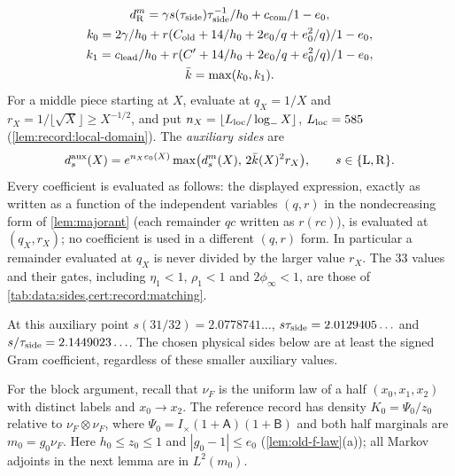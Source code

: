 \begin{definition}
\begin{gather*}
 d^m_{\rm R}=\gamma s(\tau_{\mathrm{side}})\tau_{\mathrm{side}}^{-1}/h_0+c_{\rm com}/1-e_0,\\
 k_0=2\gamma/h_0+r(C_{\rm old}+14/h_0+2e_0/q+e_0^2/q)/1-e_0,\\
 k_1=c_{\rm lead}/h_0+r(C'+14/h_0+2e_0/q+e_0^2/q)/1-e_0,\\
 \bar k=\max(k_0,k_1).
\end{gather*}
For a middle piece starting at $X$, evaluate at $q_X=1/X$ and
$r_X=1/\lfloor\sqrt X\rfloor\ge X^{-1/2}$, and put
$n_X=\lfloor L_{\rm loc}/\log_-X\rfloor$, $L_{\rm loc}=585$
(\cref{lem:record:local-domain}). The \emph{auxiliary sides} are
\[
 d^{\rm aux}_s(X)=e^{n_Xe_0(X)}
 \max\bigl(d^m_s(X),\,2\bar k(X)^2r_X\bigr),\qquad s\in\{{\rm L},{\rm R}\}.
\]
Every coefficient is evaluated as follows: the displayed
expression, exactly as written as a function of the independent
variables $(q,r)$ in the nondecreasing form of
\cref{lem:majorant} (each remainder $qc$ written as $r(rc)$), is
evaluated at $(q_X,r_X)$; no coefficient is used in a different
$(q,r)$ form. In particular a remainder evaluated at $q_X$ is
never divided by the larger value $r_X$.
The $33$ values and their gates, including $\eta_1<1$, $\rho_1<1$ and
$2\phi_\infty<1$, are those of
\cref{tab:data:sides,cert:record:matching}.
\end{definition}

At this auxiliary point $s(31/32)=2.0778741\ldots$,
$s\tau_{\mathrm{side}}=2.0129405\ldots$ and $s/\tau_{\mathrm{side}}=2.1449023\ldots$.
The chosen physical sides below are at least the signed Gram coefficient,
regardless of these smaller auxiliary values.

For the block argument, recall that $\nu_F$ is the uniform law of a half
$(x_0,x_1,x_2)$ with distinct labels and $x_0\to x_2$. The reference
record has density $K_0=\Psi_0/z_0$ relative to $\nu_F\otimes\nu_F$,
where $\Psi_0=I_\times(1+\mathsf A)(1+\mathsf B)$ and both half marginals
are $m_0=g_0\nu_F$. Here $h_0\le z_0\le1$ and $|g_0-1|\le e_0$
(\cref{lem:old-f-law}(a)); all Markov adjoints in the next lemma are in
$L^2(m_0)$.

